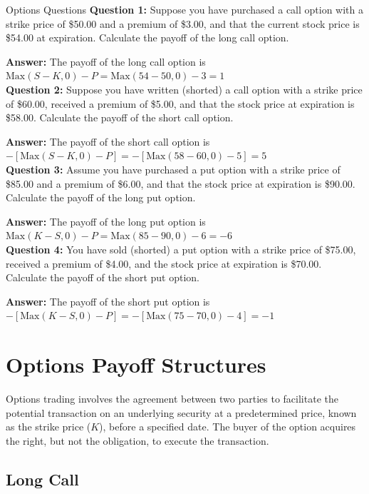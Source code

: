 \begin{examplebox}{Options Questions}
    \textbf{Question 1:} Suppose you have purchased a call option with a strike price of \$50.00 and a premium of \$3.00, and that the current stock price is \$54.00 at expiration. Calculate the payoff of the long call option.

\textbf{Answer:} The payoff of the long call option is $\text{Max}(S - K, 0) - P = \text{Max}(54 - 50, 0) - 3 = 1$\\

\textbf{Question 2:} Suppose you have written (shorted) a call option with a strike price of \$60.00, received a premium of \$5.00, and that the stock price at expiration is \$58.00. Calculate the payoff of the short call option.

\textbf{Answer:} The payoff of the short call option is $-[\text{Max}(S - K, 0) - P] = -[\text{Max}(58 - 60, 0) - 5] = 5$\\

\textbf{Question 3:} Assume you have purchased a put option with a strike price of \$85.00 and a premium of \$6.00, and that the stock price at expiration is \$90.00. Calculate the payoff of the long put option.

\textbf{Answer:} The payoff of the long put option is $\text{Max}(K - S, 0) - P = \text{Max}(85 - 90, 0) - 6 = -6$\\

\textbf{Question 4:} You have sold (shorted) a put option with a strike price of \$75.00, received a premium of \$4.00, and the stock price at expiration is \$70.00. Calculate the payoff of the short put option.

\textbf{Answer:} The payoff of the short put option is $-[\text{Max}(K - S, 0) - P] = -[\text{Max}(75 - 70, 0) - 4] = -1$\\
\end{examplebox}

\section{Options Payoff Structures}

Options trading involves the agreement between two parties to facilitate the potential transaction on an underlying security at a predetermined price, known as the strike price (\(K\)), before a specified date. The buyer of the option acquires the right, but not the obligation, to execute the transaction.

\subsection*{Long Call}

